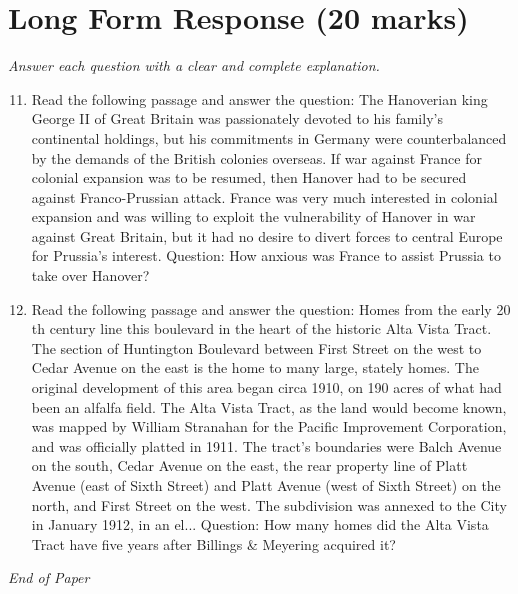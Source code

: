 \documentclass[12pt]{article}
\begin{document}
\section*{Long Form Response (20 marks)}
\textit{Answer each question with a clear and complete explanation.}
\begin{enumerate}[label=\arabic*.]
\setcounter{enumi}{10}
\item Read the following passage and answer the question: The Hanoverian king George II of Great Britain was passionately devoted to his family's continental holdings, but his commitments in Germany were counterbalanced by the demands of the British colonies overseas. If war against France for colonial expansion was to be resumed, then Hanover had to be secured against Franco-Prussian attack. France was very much interested in colonial expansion and was willing to exploit the vulnerability of Hanover in war against Great Britain, but it had no desire to divert forces to central Europe for Prussia's interest. Question: How anxious was France to assist Prussia to take over Hanover?
\item Read the following passage and answer the question: Homes from the early 20 th century line this boulevard in the heart of the historic Alta Vista Tract. The section of Huntington Boulevard between First Street on the west to Cedar Avenue on the east is the home to many large, stately homes. The original development of this area began circa 1910, on 190 acres of what had been an alfalfa field. The Alta Vista Tract, as the land would become known, was mapped by William Stranahan for the Pacific Improvement Corporation, and was officially platted in 1911. The tract's boundaries were Balch Avenue on the south, Cedar Avenue on the east, the rear property line of Platt Avenue (east of Sixth Street) and Platt Avenue (west of Sixth Street) on the north, and First Street on the west. The subdivision was annexed to the City in January 1912, in an el... Question: How many homes did the Alta Vista Tract have five years after Billings \& Meyering acquired it?
\end{enumerate}

\vfill
\noindent\textit{End of Paper}
\end{document}

